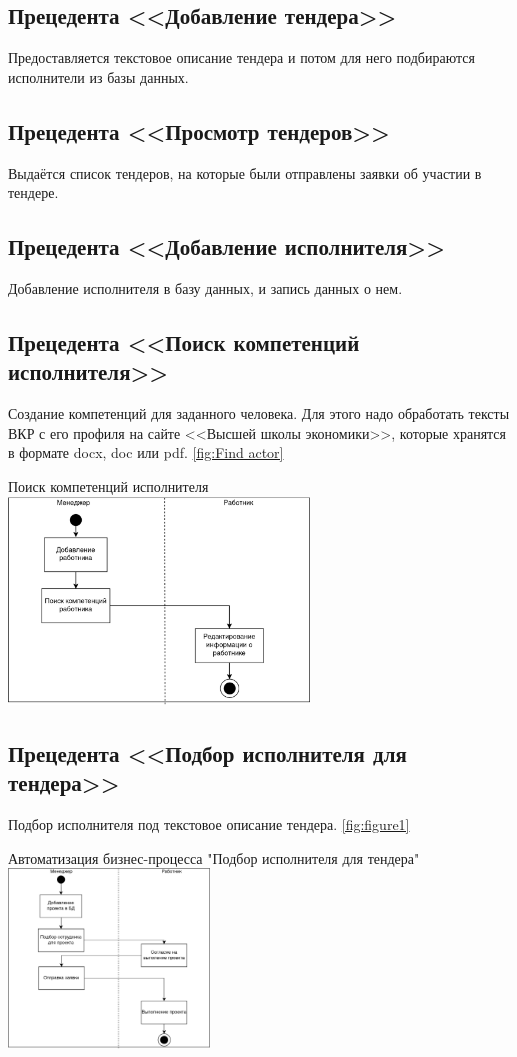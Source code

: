 \documentclass[PI,KR]{HSEUniversity}
\begin{document}
\subsection{Прецедента <<Добавление тендера>>}
Предоставляется текстовое описание тендера и потом для него подбираются исполнители из базы данных.
\subsection{Прецедента <<Просмотр тендеров>>}
Выдаётся список тендеров, на которые были отправлены заявки об участии в тендере.
\subsection{Прецедента <<Добавление исполнителя>>}
Добавление исполнителя в базу данных, и запись данных о нем.
\subsection{Прецедента <<Поиск компетенций исполнителя>>}
Создание компетенций для заданного человека. Для этого надо обработать тексты ВКР с его профиля на сайте <<Высшей школы экономики>>, которые хранятся в формате docx, doc или pdf. \ref{fig:Find actor}
\begin{FIGURE}[h]{Поиск компетенций исполнителя \label{fig:Find actor}}
	\includegraphics[width=0.6\textwidth]{img/Диаграмма Бизнес-процесса 2}
\end{FIGURE}
\subsection{Прецедента <<Подбор исполнителя для тендера>>}
Подбор исполнителя под текстовое описание тендера. \ref{fig:figure1}
\begin{FIGURE}[h]{Автоматизация бизнес-процесса "Подбор исполнителя для тендера" \label{fig:figure1}}
	\includegraphics[width=0.4\textwidth]{img/Диаграмма Бизнес-процесса 1}
\end{FIGURE}
\end{document}
